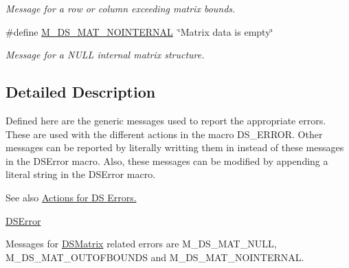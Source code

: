 \begin{DoxyCompactItemize}
\begin{DoxyCompactList}\small\item\em Message for a row or column exceeding matrix bounds. \item\end{DoxyCompactList}\item 
\hypertarget{group___m___d_s___messages_ga834bdead8f9b0e20331b57e051c7f379}{
\#define \hyperlink{group___m___d_s___messages_ga834bdead8f9b0e20331b57e051c7f379}{M\_\-DS\_\-MAT\_\-NOINTERNAL}~\char`\"{}Matrix data is empty\char`\"{}}
\label{group___m___d_s___messages_ga834bdead8f9b0e20331b57e051c7f379}

\begin{DoxyCompactList}\small\item\em Message for a NULL internal matrix structure. \item\end{DoxyCompactList}\end{DoxyCompactItemize}


\subsection{Detailed Description}
Defined here are the generic messages used to report the appropriate errors. These are used with the different actions in the macro DS\_\-ERROR. Other messages can be reported by literally writting them in instead of these messages in the DSError macro. Also, these messages can be modified by appending a literal string in the DSError macro.

\begin{DoxySeeAlso}{See also}
\hyperlink{group___a___d_s___actions}{Actions for DS Errors.} 

\hyperlink{_d_s_errors_8h_a09b28eb2b01986855910ca97dfe91144}{DSError}
\end{DoxySeeAlso}
Messages for \hyperlink{struct_d_s_matrix}{DSMatrix} related errors are M\_\-DS\_\-MAT\_\-NULL, M\_\-DS\_\-MAT\_\-OUTOFBOUNDS and M\_\-DS\_\-MAT\_\-NOINTERNAL. 